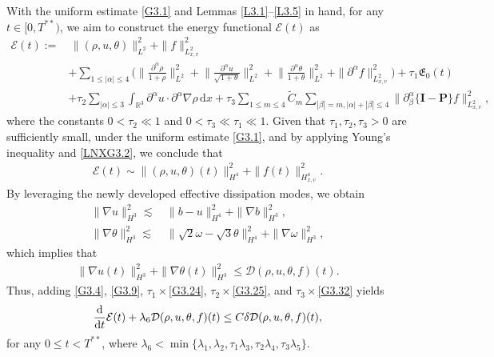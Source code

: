\documentclass[reqno,11pt]{amsart}
\theoremstyle{plain}
\numberwithin{equation}{section}
\begin{document}
With the uniform estimate   \eqref{G3.1} and Lemmas \ref{L3.1}--\ref{L3.5} in hand, for any $t \in [0, T^{**})$, we aim to construct the energy functional $\mathcal{E}(t)$ as 
\begin{align} \label{G3.33} 
\mathcal{E}(t) :=&\,\|(\rho,u,\theta)\|_{L^2}^2+\|f\|_{L_{x,v}^2}^2\nonumber\\
&+ \sum_{1\leq|\alpha|\leq
4}\bigg(\Big\|\frac{\partial^\alpha\rho}{1+\rho}\Big\|_{L^2}^2+\Big\|\frac{\partial^\alpha u}{\sqrt{1+\theta}}\Big\|_{L^2}^{2}+\Big\|\frac{\partial^\alpha\theta}{1+\theta}\Big\|_{L^2}^2 +\|\partial^\alpha f\|_{L_{x,v}^{2}}^2\bigg) + \tau_1 \mathfrak{E}_0(t)\nonumber \\  
&+ \tau_2 \sum_{|\alpha| \leq 3} \int_{\mathbb{R}^3} \partial^\alpha u \cdot \partial^\alpha \nabla \rho \, \mathrm{d}x + \tau_3 \sum_{1 \leq m \leq 4} \tilde C_m \sum_{ {|\beta| = m,  |\alpha| + |\beta| \leq 4}} \|\partial_\beta^\alpha \{\mathbf{I} - \mathbf{P}\} f\|_{L_{x,v}^2}^2,  
\end{align}  
where the constants $0 < \tau_2 \ll 1$ and $0 < \tau_3 \ll \tau_1 \ll 1$. Given that $\tau_1, \tau_2, \tau_3 > 0$ are sufficiently small, under the  uniform estimate  \eqref{G3.1}, and by applying Young's inequality and 
\eqref{LNXG3.2}, we conclude that  
\begin{align}  \label{G3.34}
\mathcal{E}(t) \sim \|(\rho, u, \theta)(t)\|_{H^4}^2 + \|f(t)\|_{H_{x,v}^4}^2.  
\end{align}  
By leveraging the newly developed effective dissipation modes, we obtain   
\begin{align*}  
\|\nabla u\|_{H^3}^2 \lesssim&\, \| b-u\|_{H^4}^2 + \|\nabla b\|_{H^3}^2, \\
\|\nabla \theta\|_{H^3}^2 \lesssim&\, \|\sqrt{2}\omega - \sqrt{3}\theta\|_{H^4}^2 + \|\nabla \omega\|_{H^3}^2,  
\end{align*} 
which implies that 
\begin{align*}
\|\nabla u(t)\|_{H^3}^2 +\|\nabla \theta(t)\|_{H^3}^2 \leq \mathcal{D}(\rho, u, \theta, f)(t).    
\end{align*}  
Thus, adding \eqref{G3.4}, \eqref{G3.9}, $\tau_1\times$\eqref{G3.24}, $\tau_2\times$\eqref{G3.25}, and $\tau_3\times$\eqref{G3.32} yields  
\begin{align*}  
\frac{{\rm d}}{{\rm d}t} \mathcal{E}(t) + \lambda_6 \mathcal{D}(\rho,u,\theta,f)(t) \leq C\delta \mathcal{D}(\rho,u,\theta,f)(t),  
\end{align*}  
for any $0 \leq t < T^{**}$, where $\lambda_6 < \min\{\lambda_1, \lambda_2, \tau_1\lambda_3, \tau_2\lambda_4, \tau_3\lambda_5\}$.
\end{document}
